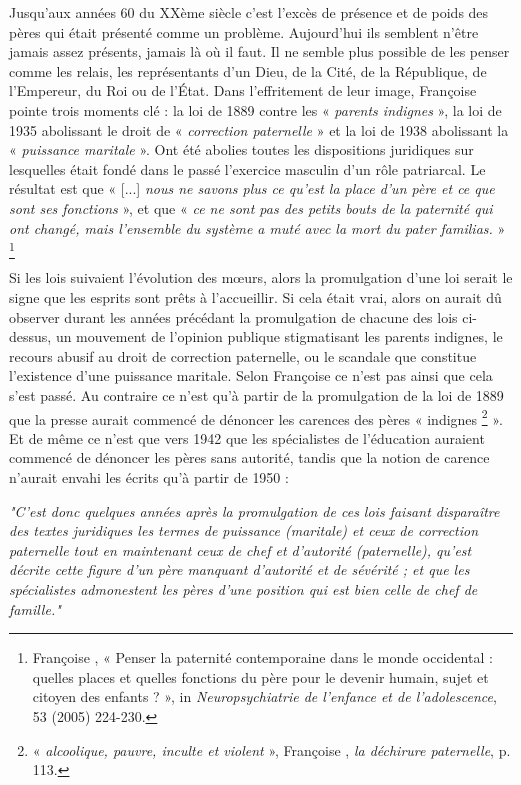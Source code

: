  



 
Jusqu'aux années 60 du XXème siècle c'est l'excès de présence et de poids des pères qui était présenté comme un problème. Aujourd'hui ils semblent n'être jamais assez présents, jamais là où il faut. Il ne semble plus possible de les penser comme les relais, les représentants d'un Dieu, de la Cité, de la République, de l'Empereur, du Roi ou de l'État. Dans l'effritement de leur image, Françoise  pointe trois moments clé : la loi de 1889 contre les « \emph{parents indignes} », la loi de 1935 abolissant le droit de « \emph{correction paternelle} » et la loi de 1938 abolissant la « \emph{puissance maritale} ». Ont été abolies toutes les dispositions juridiques sur lesquelles était fondé dans le passé l'exercice masculin d'un rôle patriarcal. Le résultat est que « [...] \emph{nous ne savons plus ce qu'est la place d'un père et ce que sont ses fonctions} », et que « \emph{ce ne sont pas des petits bouts de la paternité qui ont changé, mais l'ensemble du système a muté avec la mort du \emph{pater familias}.} »%
\footnote{Françoise , « Penser la paternité contemporaine dans le monde occidental : quelles places et quelles fonctions du père pour le devenir humain, sujet et citoyen des enfants ? », in \emph{Neuropsychiatrie de l'enfance et de l'adolescence}, 53 (2005) 224-230.} 


 
  Si les lois suivaient l'évolution des mœurs, alors la promulgation d'une loi serait le signe que les esprits sont prêts à l'accueillir. Si cela était vrai, alors on aurait dû observer durant les années précédant la promulgation de chacune des lois ci-dessus, un mouvement de l'opinion publique stigmatisant les parents indignes, le recours abusif au droit de correction paternelle, ou le scandale que constitue l'existence d'une puissance maritale. Selon Françoise  ce n'est pas ainsi que cela s'est passé. Au contraire ce n'est qu'à partir de la promulgation de la loi de 1889 que la presse aurait commencé de dénoncer les carences des pères « indignes%
\footnote{« \emph{alcoolique, pauvre, inculte et violent} », Françoise , \emph{la déchirure paternelle}, p. 113.} 
 ». Et de même ce n'est que vers 1942 que les spécialistes de l'éducation auraient commencé de dénoncer les pères sans autorité, tandis que la notion de carence n'aurait envahi les écrits qu'à partir de 1950 :
 
\begin{displayquote}
\emph{"C'est donc quelques années après la promulgation de ces lois faisant disparaître des textes juridiques les termes de puissance (maritale) et ceux de correction paternelle tout en maintenant ceux de chef et d'autorité (paternelle), qu'est décrite cette figure d'un père manquant d'autorité et de sévérité ; et que les spécialistes admonestent les pères d'une position qui est bien celle de chef de famille."}
\end{displayquote}

